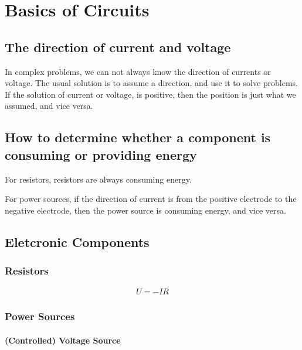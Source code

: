 


\chapter{Basics of Circuits}

\section{The direction of current and voltage}

In complex problems, we can not always know the direction of currents or voltage. The usual solution is to assume a direction, and use it to solve problems. If the solution of current or voltage, is positive, then the position is just what we assumed, and vice versa.

\section{How to determine whether a component is consuming or providing energy}

For resistors, resistors are always consuming energy.

For power sources, if the direction of current is from the positive electrode to the negative electrode, then the power source is consuming energy, and vice versa.

\section{Eletcronic Components}

\subsection{Resistors}

\begin{equation*}
  \begin{aligned}
    U = - I R
  \end{aligned}
\end{equation*}

\subsection{Power Sources}

\subsubsection{(Controlled) Voltage Source}

